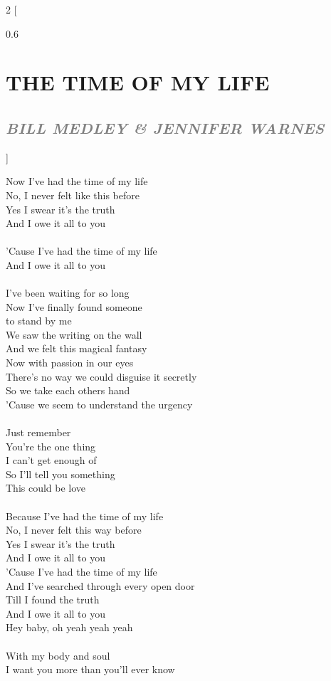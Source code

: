 \documentclass[100pt,a4paper]{report}
\newenvironment{song2}[2]
	{	
    	\begin{multicols*}{2}
		[
			\begin{spacing}{0.6}
				\section*{\LARGE\centering \MakeUppercase{\textbf{{#1}}}}
				\subsection*{\Large\centering \textit{\textcolor{gray}{\MakeUppercase{{#2}}}}}
			\end{spacing}
		]
		\Large
	}
	{
	\end{multicols*}
	\newpage
    }
\begin{document}
\begin{song2}{the time of my life}{Bill Medley \& Jennifer Warnes}
\noindent
Now I've had the time of my life\\
No, I never felt like this before\\
Yes I swear it's the truth\\
And I owe it all to you\\
\\
'Cause I've had the time of my life\\
And I owe it all to you\\
\\
I've been waiting for so long\\
Now I've finally found someone\\ 
to stand by me\\
We saw the writing on the wall\\
And we felt this magical fantasy\\
Now with passion in our eyes\\
There's no way we could disguise it secretly\\
So we take each others hand\\
'Cause we seem to understand the urgency\\
\\
Just remember\\
You're the one thing\\
I can't get enough of\\
So I'll tell you something\\
This could be love\\
\\
Because I've had the time of my life\\
No, I never felt this way before\\
Yes I swear it's the truth\\
And I owe it all to you\\
'Cause I've had the time of my life\\
And I've searched through every open door\\
Till I found the truth\\
And I owe it all to you\\
\vfill
\columnbreak
\noindent
Hey baby, oh yeah yeah yeah\\
\\
With my body and soul\\
I want you more than you'll ever know\\

\end{song2}
\end{document}
